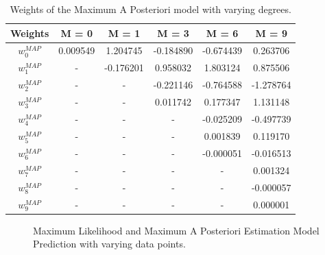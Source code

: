 \documentclass[12pt,twoside,a4paper]{article}
\begin{document}
\begin{table}[H]
\centering
\begin{tabular}{|c|c|c|c|c|c|}
\hline
\textbf{Weights}              & \textbf{M = 0} & \textbf{M = 1} & \textbf{M = 3} & \textbf{M = 6} & \textbf{M = 9} \\ \hline
\textit{\textbf{$w_0^{MAP}$}} & 0.009549       & 1.204745       & -0.184890      & -0.674439      & 0.263706       \\ \hline
\textit{\textbf{$w_1^{MAP}$}} & -              & -0.176201      & 0.958032       & 1.803124       & 0.875506       \\ \hline
\textit{\textbf{$w_2^{MAP}$}} & - & - & -0.221146 & -0.764588 & -1.278764 \\ \hline
\textit{\textbf{$w_3^{MAP}$}} & - & - & 0.011742  & 0.177347  & 1.131148  \\ \hline
\textit{\textbf{$w_4^{MAP}$}} & - & - & -         & -0.025209 & -0.497739 \\ \hline
\textit{\textbf{$w_5^{MAP}$}} & - & - & -         & 0.001839  & 0.119170  \\ \hline
\textit{\textbf{$w_6^{MAP}$}} & - & - & -         & -0.000051 & -0.016513 \\ \hline
\textit{\textbf{$w_7^{MAP}$}} & - & - & -         & -         & 0.001324  \\ \hline
\textit{\textbf{$w_8^{MAP}$}} & - & - & -         & -         & -0.000057 \\ \hline
\textit{\textbf{$w_9^{MAP}$}} & - & - & -         & -         & 0.000001  \\ \hline
\end{tabular}
\caption{Weights of the Maximum A Posteriori model with varying degrees.}
\label{MAPWEIGHTS}
\end{table}

\begin{figure}[H]
    \centering
    \hspace{0mm}
    \hspace{0mm}
    \caption{Maximum Likelihood and Maximum A Posteriori Estimation Model Prediction with varying data points.}
    \label{DATAP}
\end{figure}
\end{document}
